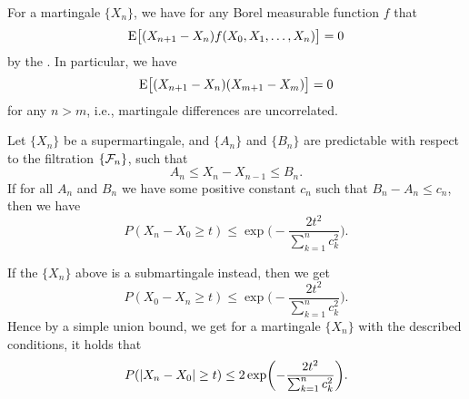 \begin{fact}
    For a martingale $\{X_n\}$, we have for any Borel measurable function $f$ that \[
        \mathop{}\!\mathrm{E}\bigl[(X_{n+1}-X_n)f(X_0,X_1,\dotsc,X_{n})\bigr] = 0
    \] by the . In particular, we have \[
        \mathop{}\!\mathrm{E}\bigl[(X_{n+1}-X_n)(X_{m+1} - X_m)\bigr] = 0
    \] for any $n > m$, i.e., martingale differences are uncorrelated.
\end{fact}

\begin{namedthm} \label{thm:Azuma-Hoeffding}
    Let $\{X_n\}$ be a supermartingale, and $\{A_n\}$ and $\{B_n\}$ are predictable with respect to the filtration $\{\mathcal{F}_n\}$, such that \[A_n \leq X_n - X_{n-1} \leq B_n.\] If for all $A_n$ and $B_n$ we have some positive constant $c_n$ such that $B_n - A_n \leq c_n$, then we have \begin{equation} \label{eq:Azuma-Hoeffding-supmg}
        P(X_n - X_0 \geq t) \leq \exp\biggl(-\frac{2 t^2}{\sum_{k=1}^n c_k^2}\biggr).
    \end{equation}

    If the $\{X_n\}$ above is a submartingale instead, then we get \[
        P(X_0 - X_n \geq t) \leq \exp\biggl(-\frac{2 t^2}{\sum_{k=1}^n c_k^2}\biggr).
    \] Hence by a simple union bound, we get for a martingale $\{X_n\}$ with the described conditions, it holds that \[
        P(\lvert X_n - X_0 \rvert \geq t) \leq 2\exp\biggl(-\frac{2 t^2}{\sum_{k=1}^n c_k^2}\biggr).
    \]
\end{namedthm}
